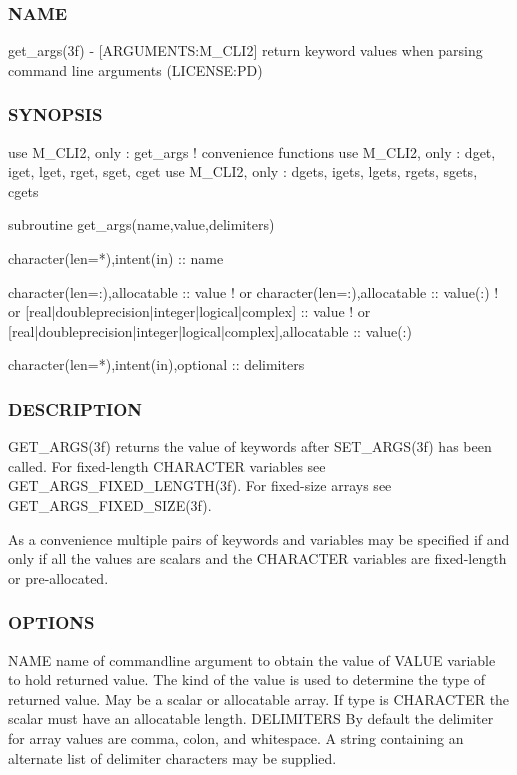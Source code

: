 \subsubsection*{N\+A\+ME}

get\+\_\+args(3f) -\/ \mbox{[}A\+R\+G\+U\+M\+E\+N\+TS\+:M\+\_\+\+C\+L\+I2\mbox{]} return keyword values when parsing command line arguments (L\+I\+C\+E\+N\+SE\+:PD) 

\subsubsection*{S\+Y\+N\+O\+P\+S\+IS}

\begin{DoxyVerb} use M_CLI2, only : get_args
 ! convenience functions
 use M_CLI2, only : dget, iget, lget, rget, sget, cget
 use M_CLI2, only : dgets, igets, lgets, rgets, sgets, cgets

 subroutine get_args(name,value,delimiters)

  character(len=*),intent(in) :: name

  character(len=:),allocatable :: value
  ! or
  character(len=:),allocatable :: value(:)
  ! or
  [real|doubleprecision|integer|logical|complex] :: value
  ! or
  [real|doubleprecision|integer|logical|complex],allocatable :: value(:)

  character(len=*),intent(in),optional :: delimiters
\end{DoxyVerb}


\subsubsection*{D\+E\+S\+C\+R\+I\+P\+T\+I\+ON}

\begin{DoxyVerb}GET_ARGS(3f) returns the value of keywords after SET_ARGS(3f)
has been called. For fixed-length CHARACTER variables
see GET_ARGS_FIXED_LENGTH(3f). For fixed-size arrays see
GET_ARGS_FIXED_SIZE(3f).

As a convenience multiple pairs of keywords and variables may be
specified if and only if all the values are scalars and the CHARACTER
variables are fixed-length or pre-allocated.
\end{DoxyVerb}


\subsubsection*{O\+P\+T\+I\+O\+NS}

\begin{DoxyVerb} NAME        name of commandline argument to obtain the value of
 VALUE       variable to hold returned value. The kind of the value
             is used to determine the type of returned value. May
             be a scalar or allocatable array. If type is CHARACTER
             the scalar must have an allocatable length.
 DELIMITERS  By default the delimiter for array values are comma,
             colon, and whitespace. A string containing an alternate
             list of delimiter characters may be supplied.
\end{DoxyVerb}


